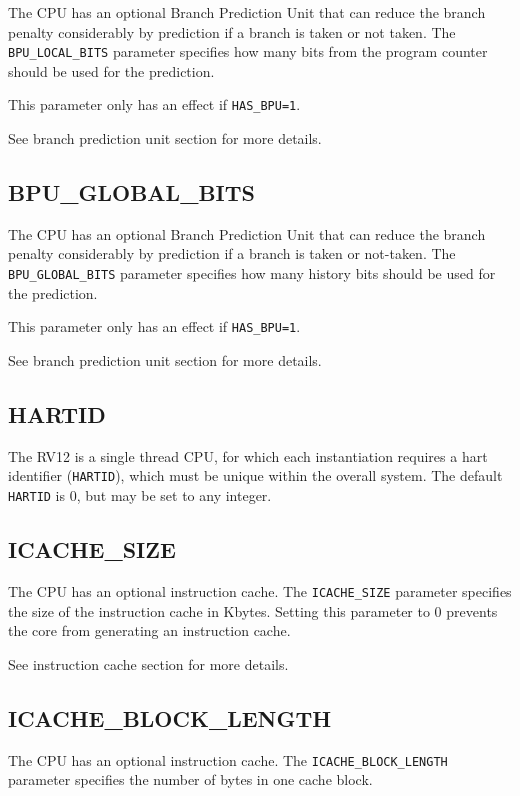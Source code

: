 The CPU has an optional Branch Prediction Unit that can reduce the
branch penalty considerably by prediction if a branch is taken or not
taken. The \texttt{BPU\_LOCAL\_BITS} parameter specifies how many bits from the
program counter should be used for the prediction.

This parameter only has an effect if \texttt{HAS\_BPU=1}.

See branch prediction unit section for more details.

\subsection{BPU\_GLOBAL\_BITS}\label{bpu_global_bits}

The CPU has an optional Branch Prediction Unit that can reduce the
branch penalty considerably by prediction if a branch is taken or
not-taken. The \texttt{BPU\_GLOBAL\_BITS} parameter specifies how many history
bits should be used for the prediction.

This parameter only has an effect if \texttt{HAS\_BPU=1}.

See branch prediction unit section for more details.

\subsection{HARTID}\label{hartid}

The RV12 is a single thread CPU, for which each instantiation requires a
hart identifier (\texttt{HARTID}), which must be unique within the overall
system. The default \texttt{HARTID} is 0, but may be set to any integer.

\subsection{ICACHE\_SIZE}\label{icache_size}

The CPU has an optional instruction cache. The \texttt{ICACHE\_SIZE} parameter
specifies the size of the instruction cache in Kbytes. Setting this
parameter to 0 prevents the core from generating an instruction cache.

See instruction cache section for more details.


\subsection{ICACHE\_BLOCK\_LENGTH}\label{icache_block_length}

The CPU has an optional instruction cache. The \texttt{ICACHE\_BLOCK\_LENGTH}
parameter specifies the number of bytes in one cache block.

